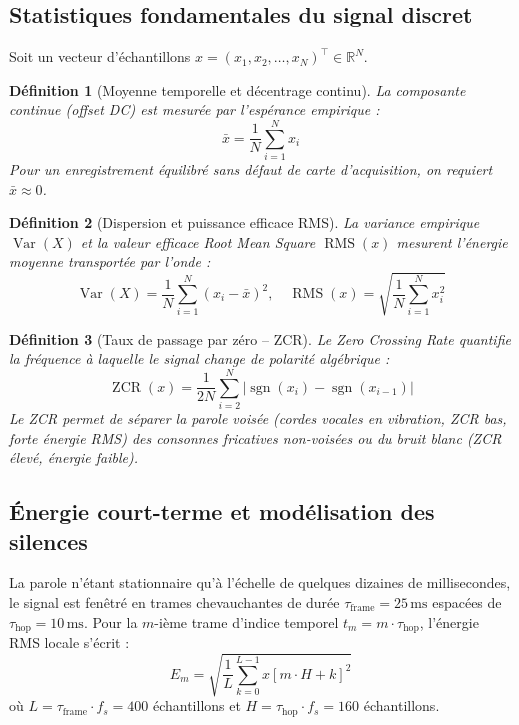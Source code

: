\documentclass[10pt,a4paper,twocolumn]{article}
\newtheorem{definition}{Définition}
\begin{document}
\subsection{Statistiques fondamentales du signal discret}
Soit un vecteur d'échantillons $x = (x_1, x_2, \dots, x_N)^\top \in \mathbb{R}^N$.

\begin{definition}[Moyenne temporelle et décentrage continu]
La composante continue (offset DC) est mesurée par l'espérance empirique :
\begin{equation}
\bar{x} = \frac{1}{N} \sum_{i=1}^N x_i
\end{equation}
Pour un enregistrement équilibré sans défaut de carte d'acquisition, on requiert $\bar{x} \approx 0$.
\end{definition}

\begin{definition}[Dispersion et puissance efficace RMS]
La variance empirique $\operatorname{Var}(X)$ et la valeur efficace \textit{Root Mean Square} $\operatorname{RMS}(x)$ mesurent l'énergie moyenne transportée par l'onde :
\begin{equation}
\operatorname{Var}(X) = \frac{1}{N} \sum_{i=1}^N (x_i - \bar{x})^2, \quad \operatorname{RMS}(x) = \sqrt{\frac{1}{N}\sum_{i=1}^N x_i^2}
\end{equation}
\end{definition}

\begin{definition}[Taux de passage par zéro -- ZCR]
Le Zero Crossing Rate quantifie la fréquence à laquelle le signal change de polarité algébrique :
\begin{equation}
\operatorname{ZCR}(x) = \frac{1}{2N} \sum_{i=2}^N \left| \operatorname{sgn}(x_i) - \operatorname{sgn}(x_{i-1}) \right|
\end{equation}
Le ZCR permet de séparer la parole voisée (cordes vocales en vibration, ZCR bas, forte énergie RMS) des consonnes fricatives non-voisées ou du bruit blanc (ZCR élevé, énergie faible).
\end{definition}

\subsection{Énergie court-terme et modélisation des silences}
La parole n'étant stationnaire qu'à l'échelle de quelques dizaines de millisecondes, le signal est fenêtré en trames chevauchantes de durée $\tau_{\text{frame}} = 25\,\text{ms}$ espacées de $\tau_{\text{hop}} = 10\,\text{ms}$. Pour la $m$-ième trame d'indice temporel $t_m = m \cdot \tau_{\text{hop}}$, l'énergie RMS locale s'écrit :
\begin{equation}
E_m = \sqrt{\frac{1}{L} \sum_{k=0}^{L-1} x[m \cdot H + k]^2}
\end{equation}
où $L = \tau_{\text{frame}} \cdot f_s = 400$ échantillons et $H = \tau_{\text{hop}} \cdot f_s = 160$ échantillons.
\end{document}
